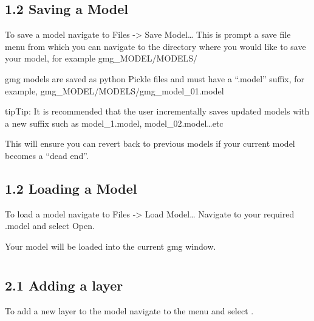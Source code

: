 \documentclass[a4paper,12pt,english]{sphinxmanual}
\begin{document}
\begin{DUlineblock}{0em}
\item[] 
\end{DUlineblock}


\subsection{1.2 Saving a Model}
\label{\detokenize{manual__models:saving-a-model}}
To save a model navigate to Files -\textgreater{} Save Model…
This is prompt a save file menu from which you can navigate to the directory where you would like to save your model,
for example gmg\_MODEL/MODELS/

gmg models are saved as python Pickle files and must have a “.model” suffix, for example,
gmg\_MODEL/MODELS/gmg\_model\_01.model

\begin{sphinxadmonition}{tip}{Tip:}
It is recommended that the user incrementally saves updated models with a new suffix such as model\_1.model,
model\_02.model…etc
\end{sphinxadmonition}

This will ensure you can revert back to previous models if your current model becomes a “dead end”.

\begin{DUlineblock}{0em}
\item[] 
\end{DUlineblock}


\subsection{1.2 Loading a Model}
\label{\detokenize{manual__models:loading-a-model}}
To load a model navigate to Files -\textgreater{} Load Model…
Navigate to your required .model and select Open.

Your model will be loaded into the current gmg window.


\section{}
\label{\detokenize{manual__layer_nodes::doc}}\label{\detokenize{manual__layer_nodes:model-layers}}
\begin{DUlineblock}{0em}
\item[] 
\end{DUlineblock}


\subsection{2.1 Adding a layer}
\label{\detokenize{manual__layer_nodes:adding-a-layer}}
To add a new layer to the model navigate to the  menu and select .
\end{document}
